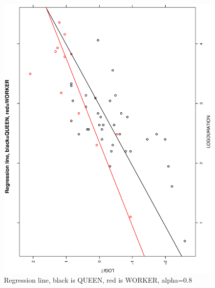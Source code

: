 \documentclass[a4paper,10pt]{article}
\begin{document}
\begin{figure}
\includegraphics[angle=-90, width=1\textwidth]{figures/math650_hw8_fig3_alpha0_8.eps}
\caption{Regression line, black is QUEEN, red is WORKER, alpha=0.8}\label{f5}
\end{figure}
\end{document}
